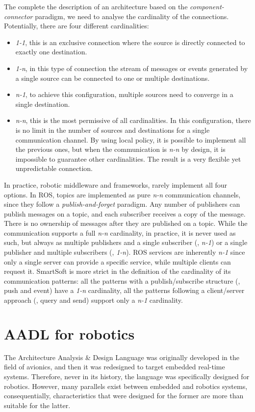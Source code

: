 The complete the description of an architecture based on the \textit{component-connector} paradigm, we need to analyse the cardinality of the connections. Potentially, there are four different cardinalities:
\begin{itemize}
\item \textit{1-1}, this is an exclusive connection where the source is directly connected to exactly one destination.
\item \textit{1-n}, in this type of connection the stream of messages or events generated by a single source can be connected to one or multiple destinations.
\item \textit{n-1}, to achieve this configuration, multiple sources need to converge in a single destination.
\item \textit{n-n}, this is the most permissive of all cardinalities. In this configuration, there is no limit in the number of sources and destinations for a single communication channel. By using local policy, it is possible to implement all the previous ones, but when the communication is \textit{n-n} by design, it is impossible to guarantee other cardinalities. The result is a very flexible yet unpredictable connection.
\end{itemize}
In practice, robotic middleware and frameworks, rarely implement all four options. In ROS, topics are implemented as pure \textit{n-n} communication channels, since they follow a \textit{publish-and-forget} paradigm. Any number of publishers can publish messages on a topic, and each subscriber receives a copy of the message. There is no ownership of messages after they are published on a topic. While the communication supports a full \textit{n-n} cardinality, in practice, it is never used as such, but always as multiple publishers and a single subscriber (\ie, \textit{n-1}) or a single publisher and multiple subscribers (\ie, \textit{1-n}). ROS services are inherently \textit{n-1} since only a single server can provide a specific service, while multiple clients can request it. SmartSoft is more strict in the definition of the cardinality of its communication patterns: all the patterns with a publish/subscribe structure (\ie, push and event) have a \textit{1-n} cardinality, all the patterns following a client/server approach (\ie, query and send) support only a \textit{n-1} cardinality.

\section{AADL for robotics}
\label{sec:aadl-robot}
The Architecture Analysis \& Design Language was originally developed in the field of avionics, and then it was redesigned to target embedded real-time systems. Therefore, never in its history, the language was specifically designed for robotics. However, many parallels exist between embedded and robotics systems, consequentially, characteristics that were designed for the former are more than suitable for the latter.

